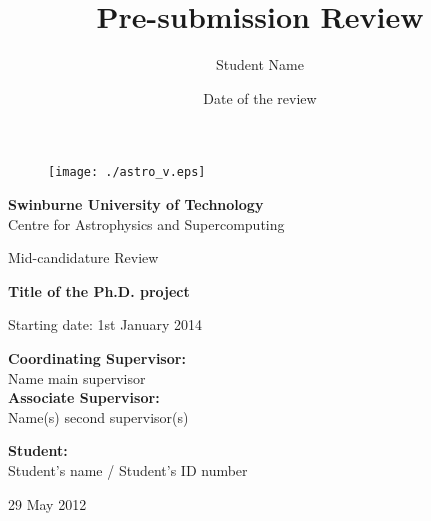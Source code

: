 \documentclass[useAMS,usenatbib,onecolumn]{mnras}
\title{Pre-submission Review}
\author[Student Name]
 {Student Name}
\begin{document}
\fontsize{11}{12.5}\selectfont
\begin{center}

\begin{figure}
\begin{center}
\texttt{[image: ./astro\_v.eps]}
\end{center}
\end{figure}

{\bf \LARGE S\Large winburne \LARGE U\Large niversity of  \LARGE T\Large echnology\\
\vspace{0.5cm}}
\LARGE C\Large entre for \LARGE A\Large strophysics and \LARGE S\Large upercomputing\\
\vspace{0.5cm}

\large Mid-candidature Review\\
\vspace{0.5cm}



\Huge{\bf Title of the Ph.D. project}

\vspace{3cm}
\large{Starting date: 1st January 2014}
\end{center}


\begin{flushleft}
{\bf Coordinating Supervisor:}\\
Name main supervisor\\
\vspace{0.5cm}
{\bf Associate Supervisor:}\\
Name(s) second supervisor(s)\\
\end{flushleft}

\begin{flushright}
{\bf Student:}\\
Student's name / Student's ID number
\end{flushright}\hspace{8cm}


\begin{center}
29 May 2012
\end{center}
\newpage

\date{Date of the review}

\end{document}
